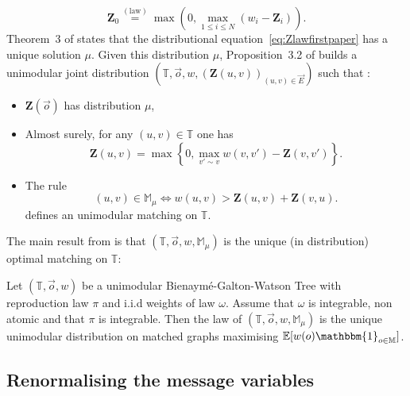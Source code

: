 \documentclass[11pt]{article}
\begin{document}
    \begin{equation}\label{eq:Zlawfirstpaper}
    \mathbf{Z}_0\overset{\mathrm{(law)}}{=}\max(0,\max_{1 \leq i \leq N} (w_i-\mathbf{Z}_i)).
    \end{equation}
Theorem~3 of \cite{enriquez2024optimalunimodularmatching} states that the distributional equation~\ref{eq:Zlawfirstpaper} has a unique solution $\mu$. Given this distribution $\mu$, Proposition~3.2 of \cite{enriquez2024optimalunimodularmatching} builds a unimodular joint distribution $\left(\mathbb{T},\overset{\rightarrow}{o},w,( \mathbf{Z}(u,v))_{(u,v) \in \overset{\rightarrow}{E}} \right)$ such that :
\begin{itemize}
\item $\mathbf{Z}(\overset{\rightarrow}{o})$ has distribution $\mu$,

\item Almost surely, for any $(u,v) \in \mathbb T$ one has
\begin{equation} \label{eq:Zweightrec}
    \mathbf{Z}(u,v) = \max \left\{ 0,\max_{v' \sim v}  w(v,v')-\mathbf{Z}(v,v')\right\}.
\end{equation}
\item The rule
\begin{equation} \label{eq:ruleM}
(u,v) \in \mathbb{M}_{\mu}\Leftrightarrow w(u,v)> \mathbf{Z}(u,v)+\mathbf{Z}(v,u).
\end{equation}
defines an unimodular matching on $\mathbb T$.
\end{itemize}
The main result from \cite[Theorem~1 and Theorem~3]{enriquez2024optimalunimodularmatching} is that $(\mathbb{T},\overset{\rightarrow}{o},w,\mathbb{M}_{\mu})$ is the unique (in distribution) optimal matching on $\mathbb{T}$:
\begin{theorem} \label{th:firstpaper}
Let $(\mathbb{T},\overset{\rightarrow}{o},w)$ be a unimodular Bienaymé-Galton-Watson Tree with reproduction law $\pi$ and i.i.d weights of law $\omega$.  
Assume that $\omega$ is integrable, non atomic and that $\pi$ is integrable.
Then the law of $(\mathbb{T},\overset{\rightarrow}{o},w,\mathbb{M}_{\mu})$ is the unique unimodular distribution on matched graphs maximising $\mathbb{E}[w(o{})\mathbbm{1}_{o \in \mathbb{M}}]$.
\end{theorem}


\subsection{Renormalising the message variables}
\end{document}
